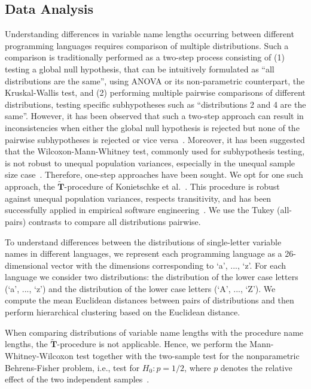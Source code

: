 \documentclass[conference]{IEEEtran}
\begin{document}
\subsection{Data Analysis}
\label{sec:da}
Understanding differences in variable name lengths occurring between different programming languages requires comparison of multiple distributions. 
Such a comparison is traditionally performed as a two-step process consisting of (1) testing a global null hypothesis, that can be intuitively formulated as ``all distributions are the same'', using ANOVA or its non-parametric counterpart, the Kruskal-Wallis test, and (2) performing multiple pairwise comparisons of different distributions, testing specific subhypotheses such as ``distributions 2 and 4 are the same''. 
However, it has been observed that such a two-step approach can result in inconsistencies when either the global null hypothesis is rejected but none of the pairwise subhypotheses is rejected or vice versa~\cite{Gabriel}. 
Moreover, it has been suggested that the Wilcoxon-Mann-Whitney test, commonly used for subhypothesis testing, is not robust to unequal population variances, especially in the unequal sample size case~\cite{Zimmerman:Zumbo}.
Therefore, one-step approaches have been sought.
We opt for one such approach, the $\widetilde{\mathbf{T}}$-procedure of Konietschke et al.~\cite{Konietschke:Hothorn:Brunner,Konietschke:nparcomp}. 
This procedure is robust against unequal population variances, respects transitivity, and has been successfully applied in empirical software engineering~\cite{Dajsuren2013,VasilescuSGM14,VasilescuCS14,YuWYW16,Jongeling2017}.
We use the Tukey (all-pairs) contrasts to compare all distributions pairwise.

To understand differences between the distributions of single-letter variable names in different languages, we represent each programming language as a 26-dimensional vector with the dimensions corresponding to `a', ..., `z'.
For each language we consider two distributions: the distribution of the lower case letters (`a', ..., `z') and the distribution of the lower case letters (`A', ..., `Z').
We compute the mean Euclidean distances between pairs of distributions and then  perform hierarchical clustering based on the Euclidean distance.

When comparing distributions of variable name lengths with the procedure name lengths, the $\widetilde{\mathbf{T}}$-procedure is not applicable.
Hence, we perform the Mann-Whitney-Wilcoxon test together with the two-sample test for the nonparametric Behrens-Fisher problem, i.e., test for
$H_0: p = 1/2$, where $p$ denotes the relative effect of the two independent samples~\cite{Konietschke:nparcomp,Neubert}.
\end{document}
